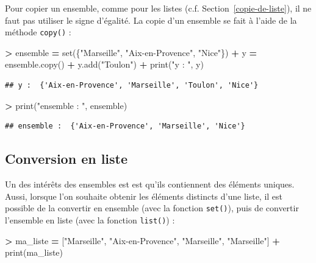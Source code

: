 \documentclass[12pt,]{book}
\newenvironment{Shaded}{\begin{snugshade}}{\end{snugshade}}
\newcommand{\StringTok}[1]{\textcolor[rgb]{0.31,0.60,0.02}{#1}}
\newcommand{\OperatorTok}[1]{\textcolor[rgb]{0.81,0.36,0.00}{\textbf{#1}}}
\newcommand{\BuiltInTok}[1]{#1}
\newcommand{\NormalTok}[1]{#1}
\numberwithin{equation}{section}
\numberwithin{countremarque}{section}
\begin{document}
Pour copier un ensemble, comme pour les listes (c.f.
Section~\ref{copie-de-liste}), il ne faut pas utiliser le signe
d'égalité. La copie d'un ensemble se fait à l'aide de la méthode
\texttt{copy()} :

\begin{Shaded}
\begin{Highlighting}[]
\OperatorTok{>}\NormalTok{ ensemble }\OperatorTok{=} \BuiltInTok{set}\NormalTok{(\{}\StringTok{"Marseille"}\NormalTok{, }\StringTok{"Aix-en-Provence"}\NormalTok{, }\StringTok{"Nice"}\NormalTok{\})}
\OperatorTok{+}\NormalTok{ y }\OperatorTok{=}\NormalTok{ ensemble.copy()}
\OperatorTok{+}\NormalTok{ y.add(}\StringTok{"Toulon"}\NormalTok{)}
\OperatorTok{+} \BuiltInTok{print}\NormalTok{(}\StringTok{"y : "}\NormalTok{, y)}
\end{Highlighting}
\end{Shaded}

\begin{lstlisting}
## y :  {'Aix-en-Provence', 'Marseille', 'Toulon', 'Nice'}
\end{lstlisting}

\begin{Shaded}
\begin{Highlighting}[]
\OperatorTok{>} \BuiltInTok{print}\NormalTok{(}\StringTok{"ensemble : "}\NormalTok{, ensemble)}
\end{Highlighting}
\end{Shaded}

\begin{lstlisting}
## ensemble :  {'Aix-en-Provence', 'Marseille', 'Nice'}
\end{lstlisting}

\subsection{Conversion en liste}\label{conversion-en-liste}

Un des intérêts des ensembles est est qu'ils contiennent des éléments
uniques. Aussi, lorsque l'on souhaite obtenir les éléments distincts
d'une liste, il est possible de la convertir en ensemble (avec la
fonction \texttt{set()}), puis de convertir l'ensemble en liste (avec la
fonction \texttt{list()}) :

\begin{Shaded}
\begin{Highlighting}[]
\OperatorTok{>}\NormalTok{ ma_liste }\OperatorTok{=}\NormalTok{ [}\StringTok{"Marseille"}\NormalTok{, }\StringTok{"Aix-en-Provence"}\NormalTok{, }\StringTok{"Marseille"}\NormalTok{, }\StringTok{"Marseille"}\NormalTok{]}
\OperatorTok{+} \BuiltInTok{print}\NormalTok{(ma_liste)}
\end{Highlighting}
\end{Shaded}
\end{document}
